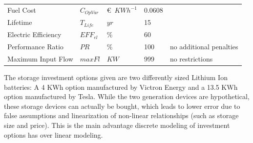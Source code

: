 \documentclass[
	11pt,								%
	DIV10,								%
	a4paper,         					%
	oneside,							%
	headheight=20pt,					%
	footheight=20pt,					%
    parskip=full,						%
    listof=totoc,						%
	bibliography=totoc,					%
	index=totoc,						%
]{scrartcl}
\begin{document}
\begin{table}[H]
\begin{tabular}{llll|p{6cm}}
		Fuel	 Cost           			& $C_{OpVar}$     		& \euro\ $KWh^{-1}$   	& 0.0608			& \cite{NaturalGasPrices2018}  \\
		Lifetime                    & $T_{Life}$     		& $yr$  				& 15 				& \cite{LAUINGER201624}  \\
		Electric Efficiency         & $EFF_{el}$       		& $\%$  				& 60				& \cite{BlueGENWorldsMost2018}  \\
		Performance Ratio           & $PR$     		& $\%$  				& 100				& no additional penalties  \\
		Maximum Input Flow  			& $maxFl$     		& $KW$ 		 			& 999				& no restrictions  \\
		\hline
	\end{tabular}
\end{table}

The storage investment options given are two differently sized Lithium Ion batteries: A 4 KWh option manufactured by Victron Energy and a 13.5 KWh option manufactured by Tesla. While the two generation devices are hypothetical, these storage devices can actually be bought, which leads to lower error due to false assumptions and linearization of non-linear relationships (such as storage size and price). This is the main advantage discrete modeling of investment options has over linear modeling.
\end{document}
